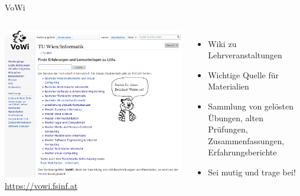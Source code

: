 \documentclass{beamer}
\begin{document}
\begin{frame}{VoWi}
  \begin{columns}
      \centering
      \includegraphics[width=\textwidth]{vowi.png}
      \url{https://vowi.fsinf.at}
      \begin{itemize}
        \item Wiki zu Lehrveranstaltungen
        \item Wichtige Quelle für Materialien
        \item Sammlung von gelösten Übungen, alten Prüfungen, Zusammenfassungen,
            Erfahrungsberichte
        \item Sei mutig und trage bei!
      \end{itemize}
  \end{columns}
\end{frame}
\end{document}
